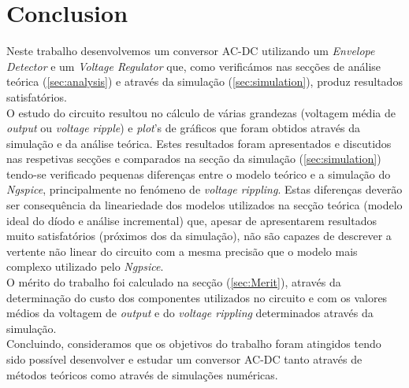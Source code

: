 \section{Conclusion}
\label{sec:conclusion}

Neste trabalho desenvolvemos um conversor AC-DC utilizando um \emph{Envelope Detector} e um \emph{Voltage Regulator} que, como verificámos
nas secções de análise teórica (\ref{sec:analysis}) e através da simulação (\ref{sec:simulation}), produz resultados satisfatórios.
\\
O estudo do circuito resultou no cálculo de várias grandezas (voltagem média de \emph{output} ou \emph{voltage ripple}) e \emph{plot}'s de gráficos que foram
obtidos através da simulação e da análise teórica. Estes resultados foram apresentados e discutidos nas respetivas secções 
e comparados na secção da simulação (\ref{sec:simulation}) tendo-se verificado pequenas diferenças entre o modelo teórico e a simulação do \emph{Ngspice},
principalmente no fenómeno de \emph{voltage rippling}. 
Estas diferenças deverão ser consequência da lineariedade dos modelos utilizados na secção teórica (modelo ideal do díodo e análise incremental)
que, apesar de apresentarem resultados muito satisfatórios (próximos dos da simulação), não são capazes de descrever a vertente não
linear do circuito com a mesma precisão que o modelo mais complexo utilizado pelo \emph{Ngpsice}.
\\
O mérito do trabalho foi calculado na secção (\ref{sec:Merit}), através da determinação do custo dos componentes utilizados no circuito e com os
valores médios da voltagem de \emph{output} e do \emph{voltage rippling} determinados através da simulação.
\\
Concluindo, consideramos que os objetivos do trabalho foram atingidos tendo sido possível desenvolver e estudar um conversor AC-DC tanto através
de métodos teóricos como através de simulações numéricas.
